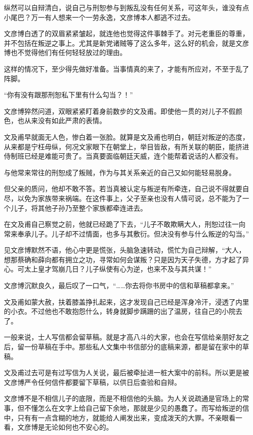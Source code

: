 纵然可以自辩清白，说自己与刑恕参与到叛乱没有任何关系，可这年头，谁没有点小尾巴？万一有人想来一个一劳永逸，文彦博本人都逃不过去。

文彦博白透了的双眉紧紧皱起，就连他也觉得这件事棘手了。对元老重臣的尊重，并不包括在叛逆之事上。尤其是新党诸贼等了这么多年，这么好的机会，就是文彦博也不觉得他们有任何轻轻放过的理由。

这样的情况下，至少得先做好准备。当事情真的来了，才能有所应对，不至于乱了阵脚。

“你有没有跟那刑恕私下里有什么勾当？！”

文彦博猝然问道，双眼紧紧盯着身前数步的文及甫。即使他一贯的对儿子不假颜色，也从来没有如此严肃的表情。

文及甫早就面无人色，惨白着一张脸。就算是文及甫也明白，朝廷对叛逆的态度，从来都是宁枉毋纵，何况文家眼下在朝堂上，举目皆敌，有所关联的朝臣，能挤进侍制班已经是难能可贵了。当真要面临朝廷天威，连个能帮着说话的人都没有。

与他常来常往的刑恕成了叛贼，作为与其关系亲近的自己又如何能轻易脱身。

但父亲的质问，他却不敢不答。若当真被认定与叛逆有所牵连，自己说不得就要自尽，以免为家族带来祸端。在这件事上，父子至亲也没有人情可说，总不能为了一个儿子，将其他子孙乃至整个家族都牵连进去。

在文及甫自己察觉之前，他就已经跪了下去，“儿子不敢欺瞒大人，刑恕过往一向常来奉承儿子。儿子却不过情面，也多与其敷衍。但决没有参与什么叛逆的勾当。”

见文彦博默然不语，他心中更是慌张，头脑急速转动，慌忙为自己辩解，“大人，想那蔡确和薛向都有拥立之功，寻常如何会谋叛？只是因为天子失德，方才起了异心。可太上皇才驾崩几日？儿子纵使有心为逆，也来不及与其共谋！”

文彦博沉默良久，最后叹了一口气，“……你去将你书房中的信和草稿都拿来。”

文及甫如蒙大赦，扶着膝盖挣扎起来，这才发现自己已经是浑身冷汗，浸透了内里的小衣。不过他也不敢抱怨什么，转身就脚步蹒跚的出了温房，往自己的小院去了。

一般来说，士人写信都会留草稿。就是才高八斗的大家，也会在写信给亲朋好友之后，留一份草稿在手中。那些私人文集中书信部分的底稿来源，都是留在家中的草稿。

文及甫过去可是有过写信为人关说，最后被牵扯进一桩大案中的前科。所以更是被文彦博严令任何信件都要留下草稿，以供日后查验和自辩。

文彦博不是不相信儿子的底限，而是不相信他的头脑。为人关说疏通是官场上的常事，但不懂怎么在文字上给自己留下余地，那就是少见的愚蠢了。而写给叛逆的信中，只有有一点含糊的地方，就能给人阐发出来，变成泼天的大罪。不亲眼看一看，文彦博是无论如何也不安心的。

